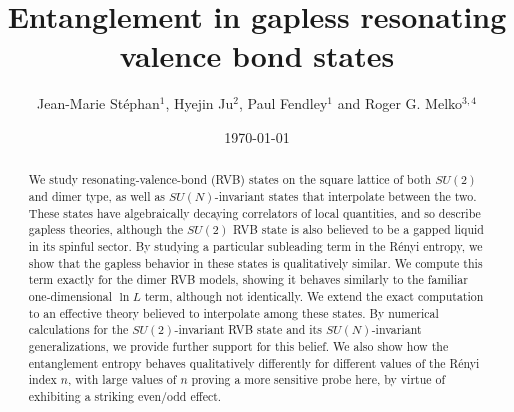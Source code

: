 \documentclass[11pt]{iopart}
\begin{document}
 
\title[Entanglement in RVB and quantum dimer states]{Entanglement in gapless resonating valence bond states}
 
\author{Jean-Marie St\'ephan$^1$, Hyejin Ju$^2$, Paul Fendley$^1$ and Roger G. Melko$^{3,4}$}

\address{$^1$ Physics Department, University of Virginia, Charlottesville, VA 22904-4714}

\address{$^2$ Department of Physics, University of California, Santa Barbara, CA, 93106-9530}

\address{$^3$ Department of Physics and Astronomy, University of Waterloo, Ontario, N2L 3G1, Canada}

\address{$^4$ Perimeter Institute for Theoretical Physics, Waterloo, Ontario N2L 2Y5, Canada}



\date{\today}
\begin{abstract}

We study resonating-valence-bond (RVB) states on the square lattice of both $SU(2)$ and dimer type,  as well as $SU(N)$-invariant states that interpolate between the two. These states have algebraically decaying correlators of local quantities, and so describe gapless theories, although the $SU(2)$ RVB state is also believed to be a gapped liquid in its spinful sector. By studying a particular subleading term in the R\'enyi entropy, we show that the gapless behavior in these states is qualitatively similar. We compute this term exactly for the dimer RVB models, showing it behaves similarly to the familiar one-dimensional $\ln L$ term, although not identically. We extend the exact computation to an effective theory believed to interpolate among these states. By numerical calculations for the $SU(2)$-invariant RVB state and its $SU(N)$-invariant generalizations, we provide further support for this belief. We also show how the entanglement entropy behaves qualitatively differently for different values of the 
R\'enyi index $n$, with large values of $n$ proving a more sensitive probe here, by virtue of exhibiting a striking even/odd effect.


\end{abstract}
\maketitle
\end{document}
